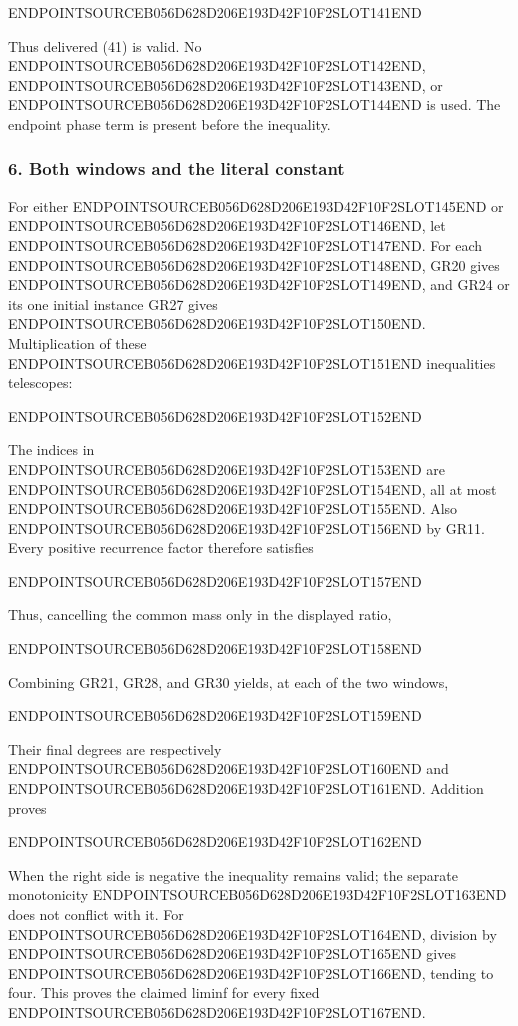 ENDPOINTSOURCEB056D628D206E193D42F10F2SLOT141END

Thus delivered (41) is valid. No ENDPOINTSOURCEB056D628D206E193D42F10F2SLOT142END, ENDPOINTSOURCEB056D628D206E193D42F10F2SLOT143END, or ENDPOINTSOURCEB056D628D206E193D42F10F2SLOT144END is used. The endpoint phase term is present before the inequality.

\subsubsection{6. Both windows and the literal constant}\label{endpoint-gamma_review--both-windows-and-the-literal-constant}

For either ENDPOINTSOURCEB056D628D206E193D42F10F2SLOT145END or ENDPOINTSOURCEB056D628D206E193D42F10F2SLOT146END, let ENDPOINTSOURCEB056D628D206E193D42F10F2SLOT147END. For each ENDPOINTSOURCEB056D628D206E193D42F10F2SLOT148END, GR20 gives ENDPOINTSOURCEB056D628D206E193D42F10F2SLOT149END, and GR24 or its one initial instance GR27 gives ENDPOINTSOURCEB056D628D206E193D42F10F2SLOT150END. Multiplication of these ENDPOINTSOURCEB056D628D206E193D42F10F2SLOT151END inequalities telescopes:

ENDPOINTSOURCEB056D628D206E193D42F10F2SLOT152END

The indices in ENDPOINTSOURCEB056D628D206E193D42F10F2SLOT153END are ENDPOINTSOURCEB056D628D206E193D42F10F2SLOT154END, all at most ENDPOINTSOURCEB056D628D206E193D42F10F2SLOT155END. Also ENDPOINTSOURCEB056D628D206E193D42F10F2SLOT156END by GR11. Every positive recurrence factor therefore satisfies

ENDPOINTSOURCEB056D628D206E193D42F10F2SLOT157END

Thus, cancelling the common mass only in the displayed ratio,

ENDPOINTSOURCEB056D628D206E193D42F10F2SLOT158END

Combining GR21, GR28, and GR30 yields, at each of the two windows,

ENDPOINTSOURCEB056D628D206E193D42F10F2SLOT159END

Their final degrees are respectively ENDPOINTSOURCEB056D628D206E193D42F10F2SLOT160END and ENDPOINTSOURCEB056D628D206E193D42F10F2SLOT161END. Addition proves

ENDPOINTSOURCEB056D628D206E193D42F10F2SLOT162END

When the right side is negative the inequality remains valid; the separate monotonicity ENDPOINTSOURCEB056D628D206E193D42F10F2SLOT163END does not conflict with it. For ENDPOINTSOURCEB056D628D206E193D42F10F2SLOT164END, division by ENDPOINTSOURCEB056D628D206E193D42F10F2SLOT165END gives ENDPOINTSOURCEB056D628D206E193D42F10F2SLOT166END, tending to four. This proves the claimed liminf for every fixed ENDPOINTSOURCEB056D628D206E193D42F10F2SLOT167END.

